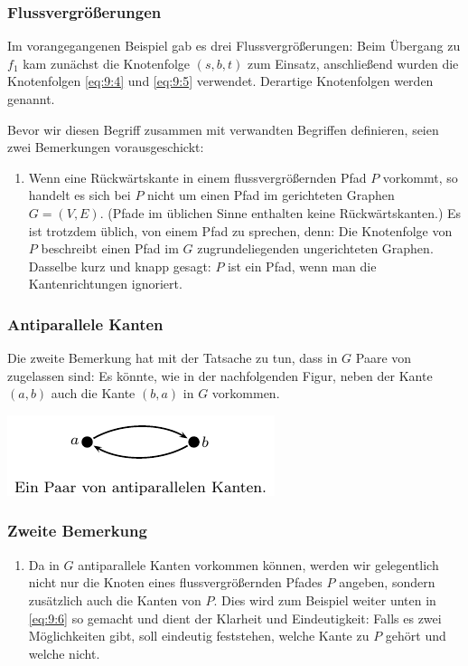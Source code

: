 \documentclass[smaller]{beamer}
\begin{document}
\begin{frame}
 \frametitle{Flussvergrößerungen}
 Im vorangegangenen Beispiel gab es drei Flussvergrößerungen: Beim Übergang zu $f_1$ kam zunächst die Knotenfolge $(s,b,t)$ zum Einsatz, anschließend wurden die Knotenfolgen \eqref{eq:9:4} und \eqref{eq:9:5} verwendet. Derartige Knotenfolgen werden  genannt. \\ \vspace*{0.2cm}
 
 Bevor wir diesen Begriff zusammen mit verwandten Begriffen definieren, seien \alert{zwei Bemerkungen} vorausgeschickt:
\begin{enumerate}[\bfseries 1.]
	\item Wenn eine Rückwärtskante in einem flussvergrößernden Pfad $P$ vorkommt, so handelt es sich bei $P$ nicht um einen Pfad im gerichteten Graphen $G=(V,E)$. (Pfade im üblichen Sinne enthalten keine Rückwärtskanten.) Es ist trotzdem üblich, von einem Pfad zu sprechen, denn: Die Knotenfolge von $P$ beschreibt einen Pfad \alert{im $G$ zugrundeliegenden ungerichteten Graphen}. Dasselbe kurz und knapp gesagt: \alert{$P$ ist ein Pfad, wenn man die Kantenrichtungen ignoriert}.
\end{enumerate}
\end{frame}

\begin{frame}
 \frametitle{Antiparallele Kanten}
 Die zweite Bemerkung hat mit der Tatsache zu tun, dass in $G$ Paare von  zugelassen sind: Es könnte, wie in der nachfolgenden Figur, neben der Kante $(a,b)$ auch die Kante $(b,a)$ in $G$ vorkommen.\\ \vspace*{0.2cm}
 \begin{center}
  \includegraphics{fig17.pdf}
 \end{center}
\end{frame}

\begin{frame}
 \frametitle{Zweite Bemerkung}
 \begin{enumerate}[\bfseries 1.]
  \addtocounter{enumi}{1}
	\item Da in $G$ antiparallele Kanten vorkommen können, werden wir gelegentlich nicht nur die Knoten eines flussvergrößernden Pfades $P$ angeben, \alert{sondern zusätzlich auch die Kanten von $P$.} Dies wird zum Beispiel weiter unten in \eqref{eq:9:6} so gemacht und dient der \alert{Klarheit und Eindeutigkeit}: Falls es zwei Möglichkeiten gibt, soll eindeutig feststehen, welche Kante zu $P$ gehört und welche nicht.
\end{enumerate}
\end{frame}
\end{document}
